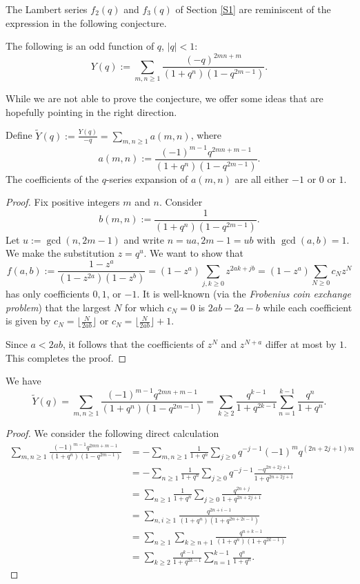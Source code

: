 \documentclass[a4paper,reqno,12pt]{amsart}
\begin{document}
The Lambert series $f_2(q)$ and $f_3(q)$ of Section \ref{S1} are reminiscent of the expression in the following conjecture.

\begin{conjecture} \cite[p. 24]{Andrews2} \label{George_conj} The following is an odd function of $q$, $|q|<1$:
$$Y(q):=\sum_{m,n\geq1} \frac{ (-q)^{2mn+m}}{(1+q^n)(1-q^{2m-1})}.$$
\end{conjecture}


While we are not able to prove the conjecture, we offer some ideas that are hopefully pointing in the right direction. 

\begin{proposition}
     \label{CA1} Define $\widetilde{Y}(q):=\frac{Y(q)}{-q}=\sum_{m,n\geq1}a(m,n)$, where  
$$a(m,n):=\frac{(-1)^{m-1}q^{2mn+m-1}}{(1+q^n)(1-q^{2m-1})}.$$ The coefficients of the $q$-series expansion of $a(m,n)$
are all either $-1$ or $0$ or $1$.
\end{proposition}

\begin{proof} Fix positive integers $m$ and $n$. Consider 
$$b(m,n):=\frac1{(1+q^n)(1-q^{2m-1})}.$$
Let $u:=\gcd(n,2m-1)$ and write $n=ua, 2m-1=ub$ with $\gcd(a,b)=1$. We make the substitution $z=q^u$. We want  to show that 
$$f(a,b):=\frac{1-z^a}{(1-z^{2a})(1-z^b)}=(1-z^a)\sum_{j,k\geq0}z^{2ak+jb}
=(1-z^a)\sum_{N\geq0} c_Nz^N$$
has only coefficients $0, 1$, or $-1$. It is well-known (via the \emph{Frobenius coin exchange problem}) that the largest $N$ for which $c_N=0$ is $2ab-2a-b$ while each coefficient is given by $c_N=\lfloor\frac{N}{2ab}\rfloor$ or $c_N=\lfloor\frac{N}{2ab}\rfloor+1$. 

\smallskip
\noindent
Since $a<2ab$, it follows that the coefficients of $z^N$ and $z^{N+a}$ differ at most by $1$. This completes the proof. 
\end{proof}




\begin{proposition} \label{step1} We have 
$$\widetilde Y(q)=\sum_{m,n\geq1} \frac{(-1)^{m-1} q^{2mn+m-1}}{(1+q^n)(1-q^{2m-1})}= \sum_{k\geq2} \frac{q^{k-1}}{1+q^{2k-1}} \sum_{n=1}^{k-1} \frac{q^n}{1+q^n}.$$
    \end{proposition}
    \begin{proof}
We consider the following direct calculation 
\begin{align*} 
\sum_{m,n\geq1} \frac{(-1)^{m-1} q^{2mn+m-1}}{(1+q^n)(1-q^{2m-1})}
&= - \sum_{m,n\geq1} \frac1{1+q^n}\sum_{j\geq0} q^{-j-1} (-1)^m q^{(2n+2j+1)m} \\
&=- \sum_{n\geq1} \frac1{1+q^n} \sum_{j\geq0}  q^{-j-1} \frac{-q^{2n+2j+1}}{1+q^{2n+2j+1}}  \\
&=\sum_{n\geq1} \frac1{1+q^n}  \sum_{j\geq0} \frac{q^{2n+j}}{1+q^{2n+2j+1}} \\
&=\sum_{n,i\geq1}  \frac{q^{2n+i-1}}{(1+q^n)(1+q^{2n+2i-1})}  \\
&=\sum_{n\geq1} \sum_{k\geq n+1}  \frac{q^{n+k-1}}{(1+q^n)(1+q^{2k-1})}   \\
&=\sum_{k\geq2} \frac{q^{k-1}}{1+q^{2k-1}} \sum_{n=1}^{k-1} \frac{q^n}{1+q^n}.
\end{align*}
\end{proof}
\end{document}
